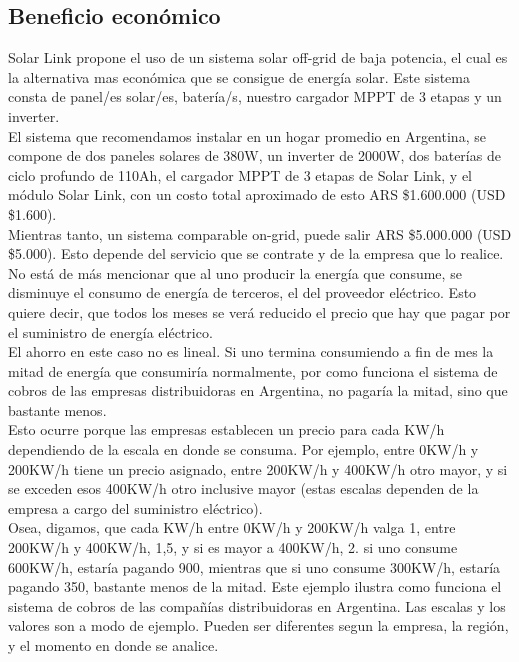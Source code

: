 \subsection{Beneficio económico}

Solar Link propone el uso de un sistema solar off-grid de baja potencia, el cual es la alternativa mas económica que se consigue de energía solar. Este sistema consta de panel/es solar/es, batería/s, nuestro cargador MPPT de 3 etapas y un inverter. \\

El sistema que recomendamos instalar en un hogar promedio en Argentina, se compone de dos paneles solares de 380W, un inverter de 2000W, dos baterías de ciclo profundo de 110Ah, el cargador MPPT de 3 etapas de Solar Link, y el módulo Solar Link, con un costo total aproximado de esto ARS \$1.600.000 (USD \$1.600).\\

Mientras tanto, un sistema comparable on-grid, puede salir ARS \$5.000.000 (USD \$5.000). Esto depende del servicio que se contrate y de la empresa que lo realice.\\

No está de más mencionar que al uno producir la energía  que consume, se disminuye el consumo de energía de terceros, el del proveedor eléctrico. Esto quiere decir, que todos los meses se verá reducido el precio que hay que pagar por el suministro de energía eléctrico.\\

El ahorro en este caso no es lineal. Si uno termina consumiendo a fin de mes la mitad de energía que consumiría normalmente, por como funciona el sistema de cobros de las empresas distribuidoras en Argentina, no pagaría la mitad, sino que bastante menos.\\

Esto ocurre porque las empresas establecen un precio para cada KW/h dependiendo de la escala en donde se consuma. Por ejemplo, entre 0KW/h y 200KW/h tiene un precio asignado, entre 200KW/h y 400KW/h otro mayor, y si se exceden esos 400KW/h otro inclusive mayor (estas escalas dependen de la empresa a cargo del suministro eléctrico).\\

Osea, digamos, que cada KW/h entre 0KW/h y 200KW/h valga 1, entre 200KW/h y 400KW/h, 1,5, y si es mayor a 400KW/h, 2. si uno consume 600KW/h, estaría pagando 900, mientras que si uno consume 300KW/h, estaría pagando 350, bastante menos de la mitad. Este ejemplo ilustra como funciona el sistema de cobros de las compañías distribuidoras en Argentina. Las escalas y los valores son a modo de ejemplo. Pueden ser diferentes segun la empresa, la región, y el momento en donde se analice.\\

